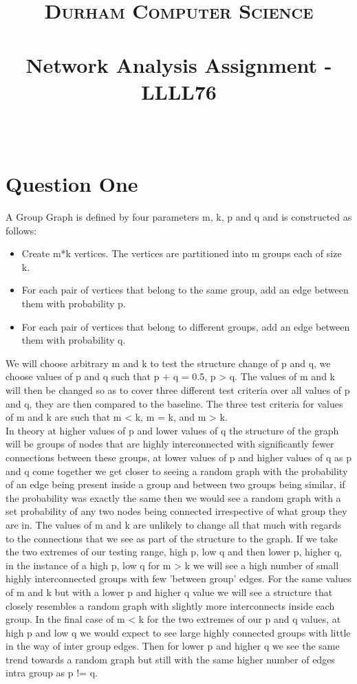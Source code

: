 \documentclass[paper=a4, fontsize=11pt]{scrartcl}
\date{}
\title{
		\vspace{-1in} 	
		\usefont{OT1}{bch}{b}{n}
		\normalfont \normalsize \textsc{Durham Computer Science} \\ [5pt]
		\horrule{0.5pt} \\[0.4cm]
		\huge  Network Analysis Assignment - LLLL76\\
		\horrule{2pt} \\[0.5cm]
		\vspace{-1in} 	
}
\numberwithin{equation}{section}		%
\numberwithin{figure}{section}			%
\numberwithin{table}{section}				%
\begin{document}
\maketitle
\section*{Question One}

A Group Graph is defined by four parameters m, k, p and q and is constructed as follows:
\begin{itemize}
  \item Create m*k vertices. The vertices are partitioned into m groups each of size k.
  \item For each pair of vertices that belong to the same group, add an edge between them with
probability p.
  \item For each pair of vertices that belong to different groups, add an edge between them
with probability q.
\end{itemize}
	
We will choose arbitrary m and k to test the structure change of p and q, we choose values of p and q such that p + q = 0.5, p > q. The values of m and k will then be changed so as to cover three different test criteria over all values of p and q, they are then compared to the baseline. The three test criteria for values of m and k are such that m < k, m = k, and m > k.\\

In theory at higher values of p and lower values of q the structure of the graph will be groups of nodes that are highly interconnected with significantly fewer connections between these groups, at lower values of p and higher values of q as p and q come together we get closer to seeing a random graph with the probability of an edge being present inside a group and between two groups being similar, if the probability was exactly the same then we would see a random graph with a set probability of any two nodes being connected irrespective of what group they are in. The values of m and k are unlikely to change all that much with regards to the connections that we see as part of the structure to the graph. If we take the two extremes of our testing range, high p, low q and then lower p, higher q, in the instance of a high p, low q for m > k we will see a high number of small highly interconnected groups with few 'between group'  edges. For the same values of m and k but with a lower p and higher q value we will see a structure that closely resembles a random graph with slightly more interconnects inside each group. In the final case of m < k for the two extremes of our p and q values, at high p and low q we would expect to see large highly connected groups with little in the way of inter group edges. Then for lower p and higher q we see the same trend towards a random graph but still with the same higher number of edges intra group as p != q.\\
\end{document}
